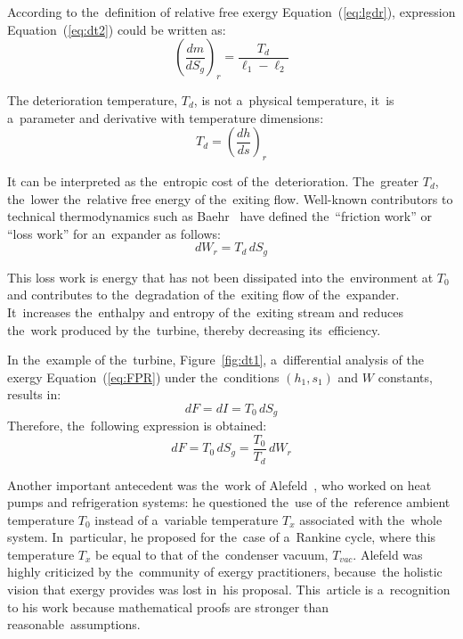 \documentclass[energies,article,accept,moreauthors,pdftex]{Definitions/mdpi}
\begin{document}
According to the~definition of relative free exergy Equation~(\ref{eq:lgdr}), expression Equation~(\ref{eq:dt2}) could be written as:
\begin{equation}
\left(\frac{dm}{dS_g}\right)_r = \frac{T_d}{\ell_1 - \ell_2}
\label{eq:dt2g}
\end{equation}

The deterioration temperature, $T_d$, is not a~physical temperature, it~is a~parameter and derivative with temperature dimensions:
\begin{equation}
T_d=\left(\frac{dh}{ds}\right)_r
\end{equation}

It can be interpreted as the~entropic cost of the~deterioration. The~greater $T_d$, the~lower the~relative free energy of the~exiting flow.
Well-known contributors to technical thermodynamics such as Baehr~\cite{Baehr2005} have defined the~“friction work” or “loss work” for an~expander as follows:
\begin{equation}
	dW_r=T_d\,dS_g
\end{equation}

This loss work is energy that has not been dissipated into the~environment at $T_0$ and contributes to the~degradation of the~exiting flow of the~expander. It~increases the~enthalpy and entropy of the~exiting stream and reduces the~work produced by the~turbine, thereby decreasing its~efficiency.

In the~example of the~turbine, Figure~\ref{fig:dt1}, a~differential analysis of the exergy Equation~(\ref{eq:FPR}) under the~conditions $(h_1,s_1)$ and $W$ constants, results in:
\begin{equation}
dF=dI=T_0\,dS_g
\label{eq:dfi}
\end{equation}
Therefore, the~following expression is obtained:
\begin{equation}
dF=T_0\,dS_g=\frac{T_0}{T_d}\,dW_r
\end{equation}

Another important antecedent was the~work of Alefeld~\cite{Alefeld1988}, who worked on heat pumps and refrigeration systems: he questioned the~use of the~reference ambient temperature $T_0$ instead of a~variable temperature $T_x$ associated with the~whole system. In~particular, he proposed for the~case of a~Rankine cycle, where this temperature $T_x$ be equal to that of the~condenser vacuum, $T_{vac}$. Alefeld was highly criticized by the~community of exergy practitioners, because~the holistic vision that exergy provides was lost in~his proposal. This~article is a~recognition to his work because mathematical proofs are stronger than reasonable~assumptions.
\end{document}
